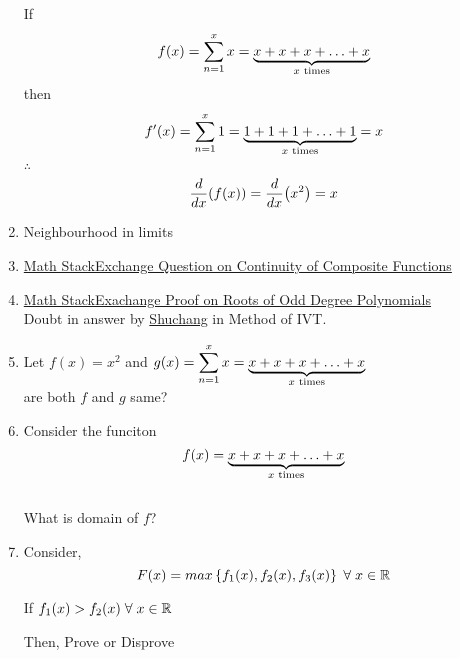 \documentclass{article}
\begin{document}
\begin{enumerate}
          If $$f(x)=\displaystyle\sum_{n=1}^{x} x=\underbrace{x+x+x+\ldots +x}_{x \hspace{1mm} \text{times}}$$
          then $$f'(x)=\displaystyle\sum_{n=1}^{x} 1=\underbrace{1+1+1+\ldots+1}_{x \hspace{1mm} \text{times}}=x$$
          $\therefore$ $$\dv{x}(f(x))=\dv{x}(x^2)=x$$
    \item Neighbourhood in limits
    \item \href{https://math.stackexchange.com/questions/4892287/is-this-result-on-continuity-of-composite-functions-true}{Math StackExchange Question on Continuity of Composite Functions}
    \item \href{https://math.stackexchange.com/questions/689575/proof-that-every-polynomial-of-odd-degree-has-one-real-root}{Math StackExachange Proof on Roots of Odd Degree Polynomials } \\ Doubt in answer by  \href{https://math.stackexchange.com/users/91982/shuchang}{Shuchang} in Method of IVT.
    \item Let $f(x)=x^2$ and $g(x)=\displaystyle\sum_{n=1}^{x}x=\underbrace{x+x+x+\ldots +x}_{x \hspace{1mm} \text{times}}$
          \\ are both $f$ and $g$ same?
    \item Consider the funciton $$f(x)=\underbrace{x+x+x+\ldots+x}_{x \hspace{1mm} \text{times}}$$ \\
          What is domain of $f$?
    \item Consider, $$F(x)=max\left\{f_{1}(x),f_{2}(x),f_{3}(x)\right\} \hspace{1mm} \forall \hspace{1mm} x \in \mathbb{R}$$

          If $f_{1}(x) > f_{2}(x) \hspace{1mm} \forall \hspace{1mm} x \in \mathbb{R}$

          Then, Prove or Disprove


\end{enumerate}
\end{document}
